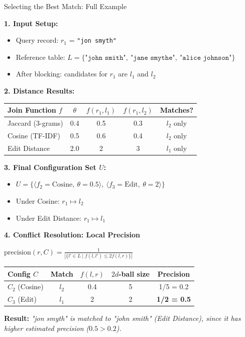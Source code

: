 \documentclass[8pt]{beamer} %
\begin{document}
\begin{frame}{Selecting the Best Match: Full Example}
	
	\textbf{1. Input Setup:}
	\begin{itemize}
		\item Query record: $r_1$ = \texttt{"jon smyth"}
		\item Reference table: $L = \{\texttt{"john smith"},\ \texttt{"jane smythe"},\ \texttt{"alice johnson"}\}$
		\item After blocking: candidates for $r_1$ are $l_1$ and $l_2$
	\end{itemize}
	
	\vspace{0.5em}
	\textbf{2. Distance Results:}
	\begin{tabular}{lcccc}
		Join Function $f$ & $\theta$ & $f(r_1, l_1)$ & $f(r_1, l_2)$ & Matches? \\
		\hline
		Jaccard (3-grams) & 0.4 & 0.5 & 0.3 & $l_2$ only \\
		Cosine (TF-IDF)   & 0.5 & 0.6 & 0.4 & $l_2$ only \\
		Edit Distance     & 2.0 & 2 & 3 & $l_1$ only \\
	\end{tabular}
	
	\vspace{0.5em}
	\textbf{3. Final Configuration Set $U$:}
	\begin{itemize}
		\item $U = \{ \langle f_2 = \text{Cosine},\ \theta = 0.5 \rangle,\ \langle f_3 = \text{Edit},\ \theta = 2 \rangle \}$
		\item Under Cosine: $r_1 \mapsto l_2$
		\item Under Edit Distance: $r_1 \mapsto l_1$
	\end{itemize}
	
	\vspace{0.5em}
	\textbf{4. Conflict Resolution: Local Precision}
	
	\vspace{0.25em}
	$\text{precision}(r, C) = \frac{1}{\left| \{ l' \in L \mid f(l, l') \leq 2f(l, r) \} \right|}$
	
	\begin{tabular}{lcccc}
		Config $C$ & Match & $f(l, r)$ & $2d$-ball size & Precision \\
		\hline
		$C_2$ (Cosine) & $l_2$ & 0.4 & 5 & 1/5 = 0.2 \\
		$C_3$ (Edit)   & $l_1$ & 2 & 2 & \textbf{1/2 = 0.5} \\
	\end{tabular}
	
	\vspace{0.5em}
	\textbf{Result:} \textit{"jon smyth" is matched to "john smith" (Edit Distance), since it has higher estimated precision ($0.5 > 0.2$).}
\end{frame}
\end{document}
